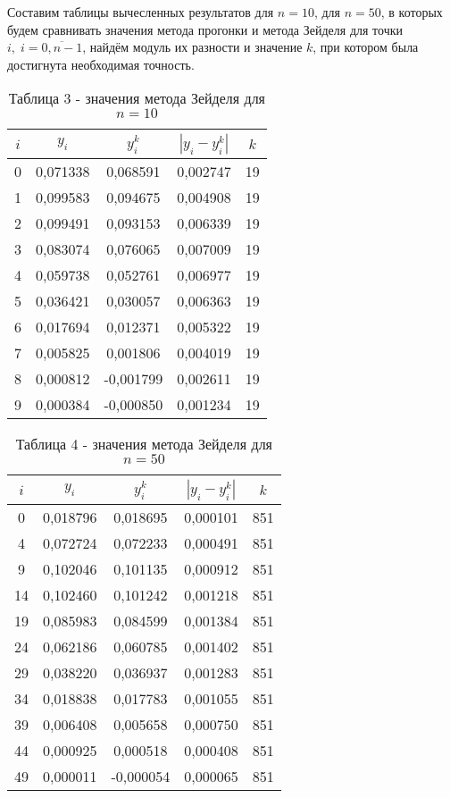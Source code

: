 \documentclass[a4paper,12pt]{article}
\begin{document}
{Составим таблицы вычесленных результатов для $n = 10$, для $n = 50$, 
в которых будем сравнивать значения метода прогонки и метода Зейделя для точки $i,\; i = \overline{0, n - 1}$, 
найдём модуль их разности и значение $k$, при котором была достигнута необходимая точность.
\begin{table}[h]
    \centering
    \begin{tabular}{|c|c|c|c|c|}
        \hline
        $i$ & $y_i$ & $y_i^k$ & $\left|y_i - y_i^k\right|$ & $k$\\
        \hline
        0 &  0,071338 &  0,068591 &  0,002747 & 19 \\ \hline
        1 &  0,099583 &  0,094675 &  0,004908 & 19 \\ \hline
        2 &  0,099491 &  0,093153 &  0,006339 & 19 \\ \hline
        3 &  0,083074 &  0,076065 &  0,007009 & 19 \\ \hline
        4 &  0,059738 &  0,052761 &  0,006977 & 19 \\ \hline
        5 &  0,036421 &  0,030057 &  0,006363 & 19 \\ \hline
        6 &  0,017694 &  0,012371 &  0,005322 & 19 \\ \hline
        7 &  0,005825 &  0,001806 &  0,004019 & 19 \\ \hline
        8 &  0,000812 & -0,001799 &  0,002611 & 19 \\ \hline
        9 &  0,000384 & -0,000850 &  0,001234 & 19 \\ \hline
    \end{tabular}
    \caption*{\small{Таблица 3 - значения метода Зейделя для $n = 10$}}
\end{table}
\begin{table}[h]
    \centering
    \begin{tabular}{|c|c|c|c|c|}
        \hline
        $i$ & $y_i$ & $y_i^k$ & $\left|y_i - y_i^k\right|$ & $k$\\
        \hline
        0 &  0,018796 &  0,018695 &  0,000101 & 851 \\ \hline
        4 &  0,072724 &  0,072233 &  0,000491 & 851 \\ \hline
        9 &  0,102046 &  0,101135 &  0,000912 & 851 \\ \hline
       14 &  0,102460 &  0,101242 &  0,001218 & 851 \\ \hline
       19 &  0,085983 &  0,084599 &  0,001384 & 851 \\ \hline
       24 &  0,062186 &  0,060785 &  0,001402 & 851 \\ \hline
       29 &  0,038220 &  0,036937 &  0,001283 & 851 \\ \hline
       34 &  0,018838 &  0,017783 &  0,001055 & 851 \\ \hline
       39 &  0,006408 &  0,005658 &  0,000750 & 851 \\ \hline
       44 &  0,000925 &  0,000518 &  0,000408 & 851 \\ \hline
       49 &  0,000011 & -0,000054 &  0,000065 & 851 \\ \hline
    \end{tabular}
    \caption*{\small{Таблица 4 - значения метода Зейделя для $n = 50$}}
\end{table}
\clearpage
}
\end{document}
